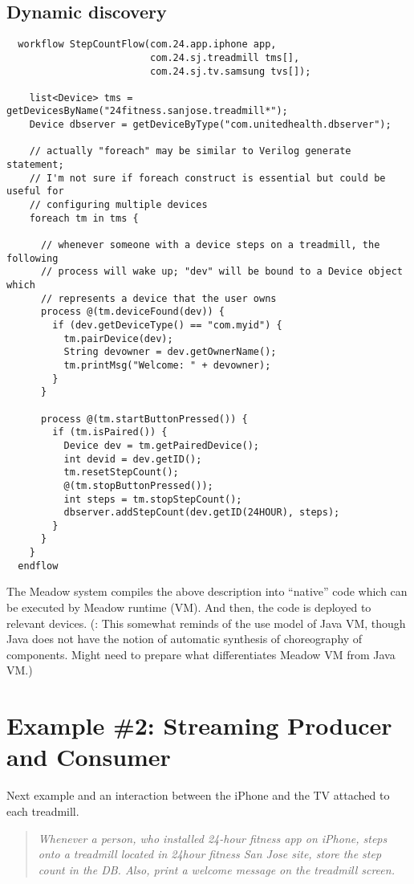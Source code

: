 \documentclass{note}
\begin{document}
\subsection{Dynamic discovery}
\begin{verbatim}
  workflow StepCountFlow(com.24.app.iphone app,
                         com.24.sj.treadmill tms[],
                         com.24.sj.tv.samsung tvs[]);

    list<Device> tms = getDevicesByName("24fitness.sanjose.treadmill*");
    Device dbserver = getDeviceByType("com.unitedhealth.dbserver");

    // actually "foreach" may be similar to Verilog generate statement;
    // I'm not sure if foreach construct is essential but could be useful for 
    // configuring multiple devices 
    foreach tm in tms {
   
      // whenever someone with a device steps on a treadmill, the following
      // process will wake up; "dev" will be bound to a Device object which 
      // represents a device that the user owns
      process @(tm.deviceFound(dev)) {
        if (dev.getDeviceType() == "com.myid") {
          tm.pairDevice(dev);
          String devowner = dev.getOwnerName();
          tm.printMsg("Welcome: " + devowner);
        }
      }

      process @(tm.startButtonPressed()) {
        if (tm.isPaired()) {
          Device dev = tm.getPairedDevice();
          int devid = dev.getID();
          tm.resetStepCount();
          @(tm.stopButtonPressed());
          int steps = tm.stopStepCount();
          dbserver.addStepCount(dev.getID(24HOUR), steps);
        }
      }
    }
  endflow
\end{verbatim}
The Meadow system compiles the above description into ``native'' code which
can be executed by Meadow runtime (VM). And then, the code is deployed to
relevant devices. (: This somewhat reminds of the use model of Java
VM, though Java does not have the notion of automatic synthesis of
choreography of components. Might need to prepare what differentiates Meadow
VM from Java VM.) 


\section{Example \#2: Streaming Producer and Consumer}
Next example and an interaction between the iPhone and the TV attached to each
treadmill. 
\begin{quote}
  \textcolor{red2}{\em Whenever a person, who installed 24-hour fitness app on iPhone, steps
    onto a treadmill located in 24hour fitness San Jose site, store the step
    count in the DB. Also, print a welcome message on the treadmill screen.\/} 
\end{quote}
\end{document}
